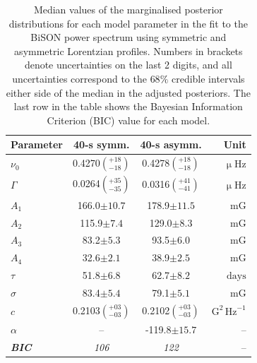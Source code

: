 \begin{table}[ht!]
	\begin{center}
		\caption{Median values of the marginalised posterior distributions for each model parameter in the fit to the BiSON power spectrum using symmetric and asymmetric Lorentzian profiles. Numbers in brackets denote uncertainties on the last 2 digits, and all uncertainties correspond to the $68 \%$ credible intervals either side of the median in the adjusted posteriors. The last row in the table shows the Bayesian Information Criterion (BIC) value for each model.}
		\label{tab:PSD_fit_params}
		\begin{tabular}{l c c r}
			\hline
			{\bf Parameter} & {\bf 40-s symm.} & {\bf 40-s asymm.} & {\bf Unit} \\
			\hline
			
			{$\nu_0$} & {0.4270$\left(_{-18}^{+18}\right)$} & {0.4278$\left(_{-18}^{+18}\right)$} & {$\upmu\mathrm{Hz} $}\\
			
			{$\Gamma$} & {0.0264$\left(_{-35}^{+35}\right)$} & {0.0316$\left(_{-41}^{+41}\right)$} & {$\upmu\mathrm{Hz} $} \\
			
			{$A_1$} & {166.0$\pm10.7 $} & {178.9$\pm 11.5$} & {$\mathrm{mG}$} \\
			
			{$A_2$} & {115.9$\pm7.4$} & {129.0$\pm 8.3$} & {$\mathrm{mG}$} \\
			
			{$A_3$} & {83.2$\pm5.3$} & {93.5$\pm 6.0$} & {$\mathrm{mG}$} \\
			
			{$A_4$} & {32.6$\pm2.1$} & {38.9$\pm 2.5$} &  {$\mathrm{mG}$} \\	
			
			{$\tau$} & {51.8$\pm6.8$} & {62.7$\pm8.2$} & {$\mathrm{days}$} \\	
			
			{$\sigma$} & {83.4$\pm5.4$} & {79.1$\pm5.1$} &  {$\mathrm{mG}$} \\	
			
			{$c$} & {0.2103$\left(_{-03}^{+03}\right)$} & {0.2102$\left(_{-03}^{+03}\right)$}  & {$\mathrm{G}^2 \, \mathrm{Hz}^{-1}$} \\	
			
			{$\alpha$} & {--} & {-119.8$\pm15.7$} & {--} \\	
			\hline
			{\bf \textit{BIC}} & \textit{{106}} & \textit{{122}} & {--} \\
			\hline
		\end{tabular}
	\end{center}
\end{table}

